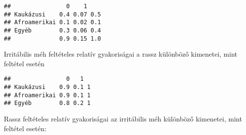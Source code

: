 \documentclass[
]{book}
\newenvironment{Shaded}{\begin{snugshade}}{\end{snugshade}}
\newcommand{\DecValTok}[1]{\textcolor[rgb]{0.00,0.00,0.81}{#1}}
\newcommand{\FunctionTok}[1]{\textcolor[rgb]{0.00,0.00,0.00}{#1}}
\newcommand{\NormalTok}[1]{#1}
\newcommand{\OtherTok}[1]{\textcolor[rgb]{0.56,0.35,0.01}{#1}}
\newcommand{\SpecialCharTok}[1]{\textcolor[rgb]{0.00,0.00,0.00}{#1}}
\begin{document}
\begin{Shaded}
\end{Shaded}

\begin{verbatim}
##                0    1    
## Kaukázusi    0.4 0.07 0.5
## Afroamerikai 0.1 0.02 0.1
## Egyéb        0.3 0.06 0.4
##              0.9 0.15 1.0
\end{verbatim}

Irritábilis méh feltételes relatív gyakoriságai a rassz különböző kimenetei, mint feltétel esetén

\begin{Shaded}
\end{Shaded}

\begin{verbatim}
##                0   1  
## Kaukázusi    0.9 0.1 1
## Afroamerikai 0.9 0.1 1
## Egyéb        0.8 0.2 1
\end{verbatim}

Rassz feltételes relatív gyakoriságai az irritábilis méh különböző kimenetei, mint feltétel esetén:

\begin{Shaded}
\end{Shaded}
\end{document}
